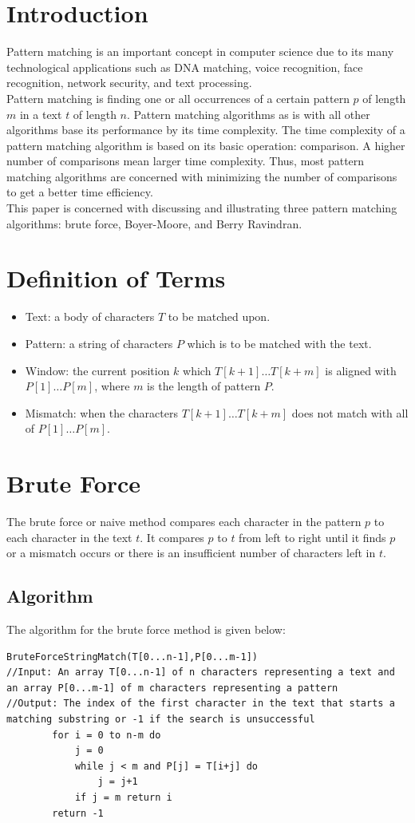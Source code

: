 \section{Introduction}
 Pattern matching is an important concept in computer science due to its many technological applications such as DNA matching, voice recognition, face recognition, network security, and text processing.\cite{fsw}
\\
Pattern matching is finding one or all occurrences of a certain pattern $p$ of length $m$ in a text $t$ of length $n$. \cite{fsw} Pattern matching algorithms as is with all other algorithms base its performance by its time complexity. The time complexity of a pattern matching algorithm is based on its basic operation: comparison. A higher number of comparisons mean larger time complexity.\cite{fsw} Thus, most pattern matching algorithms are concerned with minimizing the number of comparisons to get a better time efficiency.
\\
This paper is concerned with discussing and illustrating three pattern matching algorithms: brute force, Boyer-Moore, and Berry Ravindran. 
\section{Definition of Terms}

\begin{itemize}
	\item Text: a body of characters $T$ to be matched upon.
	\item Pattern: a string of characters $P$ which is to be matched with the text.
  \item Window: the current position $k$ which $T[k+1]\ldots T[k+m]$ is aligned with $P[1]\ldots P[m]$, where $m$ is the length of pattern $P$.
  \item Mismatch: when the characters $T[k+1]\ldots T[k+m]$ does not match with all of $P[1]\ldots P[m]$.
\end{itemize}

\section{Brute Force}
The brute force or naive method compares each character in the pattern $p$ to each character in the text $t$. It compares $p$ to $t$ from left to right until it finds $p$ or a mismatch occurs or there is an insufficient number of characters left in $t$. \cite{berry}
\subsection{Algorithm}\cite{bruteforce}
The algorithm for the brute force method is given below:
\begin{lstlisting}
BruteForceStringMatch(T[0...n-1],P[0...m-1])
//Input: An array T[0...n-1] of n characters representing a text and an array P[0...m-1] of m characters representing a pattern
//Output: The index of the first character in the text that starts a matching substring or -1 if the search is unsuccessful
		for i = 0 to n-m do
			j = 0
			while j < m and P[j] = T[i+j] do
				j = j+1
			if j = m return i
		return -1 
\end{lstlisting} 
